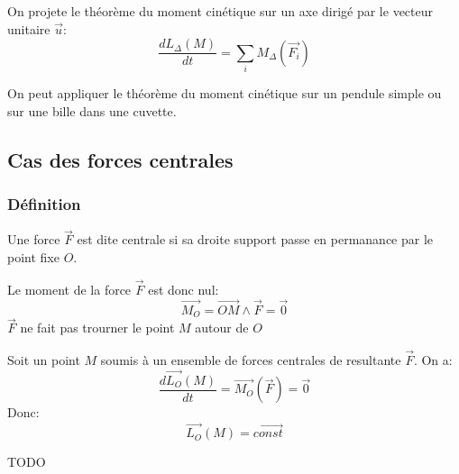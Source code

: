 \begin{theorem}
    On projete le théorème du moment cinétique sur un axe dirigé
    par le vecteur unitaire $\vec{u}$:
    \[\frac{dL_{\Delta}(M)}{dt} = \sum_{i} M_{\Delta}(\vec{F_{i}})\]
\end{theorem}

\begin{ex}
    On peut appliquer le théorème du moment cinétique sur un pendule simple ou 
    sur une bille dans une cuvette.
\end{ex}


\subsection{Cas des forces centrales}
\subsubsection{Définition}

\begin{definition}
    Une force $\vec{F}$ est dite centrale si sa droite support passe 
    en permanance par le point fixe $O$.
\end{definition}

\begin{cons}
    Le moment de la force $\vec{F}$ est donc nul:
    \[\vec{M_{O}} = \vec{OM} \wedge \vec{F} = \vec{0}\]
    $\vec{F}$ ne fait pas trourner le point $M$ autour de $O$
\end{cons}

\begin{cons}
    Soit un point $M$ soumis à un ensemble de forces centrales de resultante $\vec{F}$.
    On a:
    \[\frac{d\vec{L_{O}}(M)}{dt} = \vec{M_{O}}(\vec{F}) = \vec{0}\]
    Donc:
    \[\vec{L_{O}}(M) = \vec{const}\]

    TODO
\end{cons}

